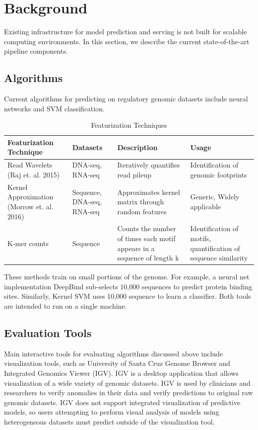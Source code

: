 \documentclass{sig-alternate-05-2015}
\begin{document}
\section{Background}
Existing infrastructure for model prediction and serving is not built for scalable computing environments. In this section, we describe the current state-of-the-art pipeline components. 

\subsection{Algorithms}
Current algorithms for predicting on regulatory genomic datasets include neural networks and SVM classification. 
\begin{table}[t]
\centering
\caption{Featurization Techniques}
\label{my-label}
\begin{tabular}{| L{2cm} | L{1.45cm} | L{2cm} | L{1.75cm} |}
\hline
Featurization Technique & Datasets & Description & Usage
\\ \hline
Read Wavelets \newline 
(Raj et. al. 2015)           & DNA-seq, RNA-seq           & Iteratively quantifies read pileup                                 & Identification of genomic footprints \\ \hline 
Kernel Approximation  
(Morrow et. al. 2016) & Sequence, DNA-seq,  
RNA-seq & Approximates kernel matrix through random features & Generic, Widely applicable                                      \\ \hline
K-mer counts & Sequence & Counts the number of times each motif 
appears in a sequence of length k & Identification 
of motifs, quantification of sequence similarity \\ \hline
\end{tabular}
\end{table}
These methods train on small portions of the genome. For example, a neural net implementation DeepBind sub-selects 10,000 sequences to predict protein binding sites. Similarly, Kernel SVM uses 10,000 sequence to learn a classifier. Both tools are intended to run on a single machine. \\

\subsection{Evaluation Tools}
Main interactive tools for evaluating algorithms discussed above include visualization tools, such as University of Santa Cruz Genome Browser and Integrated Genomics Viewer (IGV). IGV is a desktop application that allows visualization of a wide variety of genomic datasets. IGV is used by clinicians and researchers to verify anomalies in their data and verify predictions to original raw genomic datasets. IGV does not support integrated visualization of predictive models, so users attempting to perform visual analysis of models using heterogeneous datasets must predict outside of the visualization tool.
\end{document}
